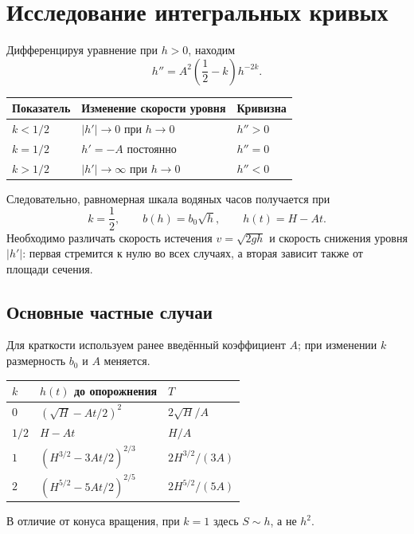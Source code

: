﻿\documentclass[12pt,a4paper]{article}
\begin{document}
\section{Исследование интегральных кривых}
Дифференцируя уравнение при $h>0$, находим
\[
h''=A^2\left(\frac12-k\right)h^{-2k}.
\]
\begin{center}
\begin{tabular}{lll}
\toprule
Показатель & Изменение скорости уровня & Кривизна\\
\midrule
$k<1/2$ & $|h'|\to0$ при $h\to0$ & $h''>0$\\
$k=1/2$ & $h'=-A$ постоянно & $h''=0$\\
$k>1/2$ & $|h'|\to\infty$ при $h\to0$ & $h''<0$\\
\bottomrule
\end{tabular}
\end{center}
Следовательно, равномерная шкала водяных часов получается при
\[
\boxed{k=\frac12,\qquad b(h)=b_0\sqrt h,\qquad h(t)=H-At.}
\]
Необходимо различать скорость истечения $v=\sqrt{2gh}$ и скорость снижения уровня $|h'|$: первая стремится к нулю во всех случаях, а вторая зависит также от площади сечения.

\subsection{Основные частные случаи}
Для краткости используем ранее введённый коэффициент $A$; при изменении $k$ размерность $b_0$ и $A$ меняется.
\begin{center}
\begin{tabular}{lll}
\toprule
$k$ & $h(t)$ до опорожнения & $T$\\
\midrule
$0$ & $(\sqrt H-At/2)^2$ & $2\sqrt H/A$\\
$1/2$ & $H-At$ & $H/A$\\
$1$ & $(H^{3/2}-3At/2)^{2/3}$ & $2H^{3/2}/(3A)$\\
$2$ & $(H^{5/2}-5At/2)^{2/5}$ & $2H^{5/2}/(5A)$\\
\bottomrule
\end{tabular}
\end{center}
В отличие от конуса вращения, при $k=1$ здесь $S\sim h$, а не $h^2$.
\end{document}
